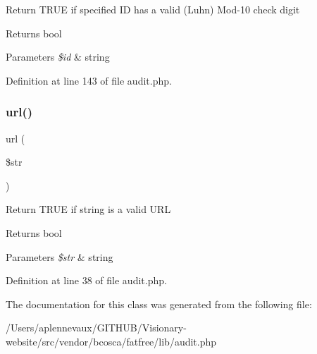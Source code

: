 Return T\+R\+UE if specified ID has a valid (Luhn) Mod-\/10 check digit \begin{DoxyReturn}{Returns}
bool 
\end{DoxyReturn}

\begin{DoxyParams}{Parameters}
{\em \$id} & string \\
\hline
\end{DoxyParams}


Definition at line 143 of file audit.\+php.

\hypertarget{class_audit_aef8b9a57041dec7db0ff956bba1d8b3f}{}\label{class_audit_aef8b9a57041dec7db0ff956bba1d8b3f} 
\subsubsection{\texorpdfstring{url()}{url()}}
{\footnotesize\ttfamily url (\begin{DoxyParamCaption}\item[{}]{\$str }\end{DoxyParamCaption})}

Return T\+R\+UE if string is a valid U\+RL \begin{DoxyReturn}{Returns}
bool 
\end{DoxyReturn}

\begin{DoxyParams}{Parameters}
{\em \$str} & string \\
\hline
\end{DoxyParams}


Definition at line 38 of file audit.\+php.



The documentation for this class was generated from the following file\+:\begin{DoxyCompactItemize}
\item 
/\+Users/aplennevaux/\+G\+I\+T\+H\+U\+B/\+Visionary-\/website/src/vendor/bcosca/fatfree/lib/audit.\+php\end{DoxyCompactItemize}
